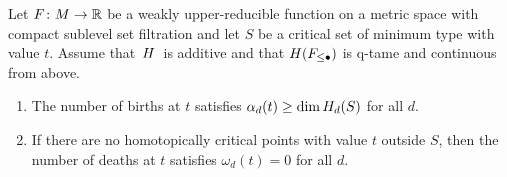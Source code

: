 \begin{lem}
\label{lem:minimum_type_implies_some_birth_and_no_death}
	Let $F \colon M \to \mathbb{R}$ be a weakly upper-reducible function on a metric space with compact sublevel set filtration and let $S$ be a critical set of minimum type with value $t$.
	Assume that~$H$~is additive and that $H(F_{\leq \bullet})$ is q-tame and continuous from above.
	\begin{enumerate}
		\item The number of births at $t$ satisfies $\alpha_d(t) \geq \dim H_d(S)$ for all $d$.
		\item If there are no homotopically critical points with value $t$ outside $S$, then the number of deaths at $t$ satisfies $\omega_d(t) = 0$ for all $d$.
	\end{enumerate}
\end{lem}
